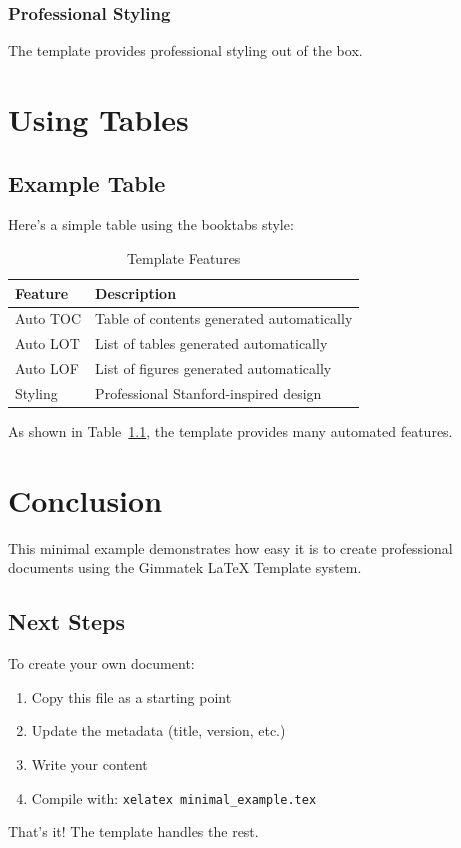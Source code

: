 \documentclass[12pt,a4paper]{gimmatek-report-template}
\begin{document}
\subsection{Professional Styling}

The template provides professional styling out of the box.

\chapter{Using Tables}

\section{Example Table}

Here's a simple table using the booktabs style:

\begin{table}[htbp]
\centering
\begin{tabularx}{\textwidth}{l X}
\toprule
\textbf{Feature} & \textbf{Description} \\
\midrule
Auto TOC & Table of contents generated automatically \\
Auto LOT & List of tables generated automatically \\
Auto LOF & List of figures generated automatically \\
Styling & Professional Stanford-inspired design \\
\bottomrule
\end{tabularx}
\caption{Template Features}
\label{tab:features}
\end{table}

As shown in Table~\ref{tab:features}, the template provides many automated features.

\chapter{Conclusion}

This minimal example demonstrates how easy it is to create professional
documents using the Gimmatek LaTeX Template system.

\section{Next Steps}

To create your own document:

\begin{enumerate}
\item Copy this file as a starting point
\item Update the metadata (title, version, etc.)
\item Write your content
\item Compile with: \texttt{xelatex minimal\_example.tex}
\end{enumerate}

That's it! The template handles the rest.
\end{document}
